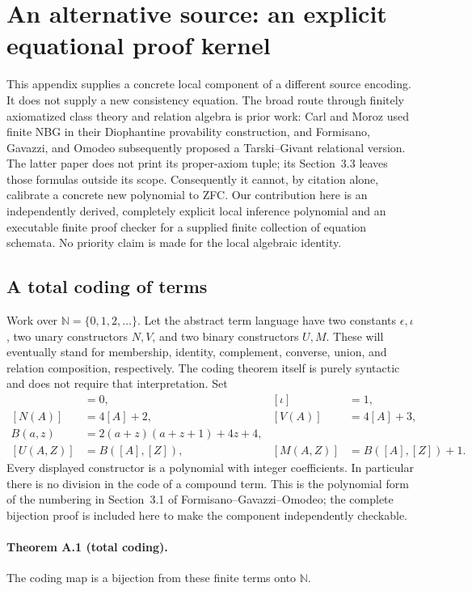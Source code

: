 \section{An alternative source: an explicit equational proof kernel}
\label{sec:relational-kernel}

This appendix supplies a concrete local component of a different source
encoding.  It does not supply a new consistency equation.  The broad route
through finitely axiomatized class theory and relation algebra is prior
work: Carl and Moroz used finite NBG in their Diophantine provability
construction, and Formisano, Gavazzi, and Omodeo subsequently proposed a
Tarski--Givant relational version.  The latter paper does not print its
proper-axiom tuple; its Section~3.3 leaves those formulas outside its scope.
Consequently it cannot, by citation alone, calibrate a concrete new
polynomial to ZFC.  Our contribution here is an independently derived,
completely explicit local inference polynomial and an executable finite
proof checker for a supplied finite collection of equation schemata.
No priority claim is made for the local algebraic identity.

\subsection{A total coding of terms}

Work over $\mathbb N=\{0,1,2,\ldots\}$.  Let the abstract term language have
two constants $\epsilon,\iota$, two unary constructors $N,V$, and two binary
constructors $U,M$.  These will eventually stand for membership, identity,
complement, converse, union, and relation composition, respectively.  The
coding theorem itself is purely syntactic and does not require that
interpretation.  Set
\begin{align*}
 [\epsilon]&=0,& [\iota]&=1,\\
 [N(A)]&=4[A]+2,&[V(A)]&=4[A]+3,\\
 B(a,z)&=2(a+z)(a+z+1)+4z+4,\\
 [U(A,Z)]&=B([A],[Z]),&[M(A,Z)]&=B([A],[Z])+1.
\end{align*}
Every displayed constructor is a polynomial with integer coefficients.
In particular there is no division in the code of a compound term.
This is the polynomial form of the numbering in Section~3.1 of
Formisano--Gavazzi--Omodeo; the complete bijection proof is included here
to make the component independently checkable.

\paragraph{Theorem A.1 (total coding).}
The coding map is a bijection from these finite terms onto $\mathbb N$.

